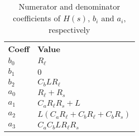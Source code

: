 \begin{table}[H]
\centering
\begin{tabular}[c]{ll}
\textbf{Coeff} & \textbf{Value} \\ 
\rowcolor{myyellow}
$b_{0}$ &$R_{\ell}$ \\ 
$b_{1}$ &$0$ \\ 
\rowcolor{myyellow}
$b_{2}$ &$C_{b} L R_{\ell}$ \\ 
$a_{0}$ &$R_{\ell} + R_{s}$ \\ 
\rowcolor{myyellow}
$a_{1}$ &$C_{a} R_{\ell} R_{s} + L$ \\ 
$a_{2}$ &$L \left(C_{a} R_{\ell} + C_{b} R_{\ell} + C_{b} R_{s}\right)$ \\ 
\rowcolor{myyellow}
$a_{3}$ &$C_{a} C_{b} L R_{\ell} R_{s}$ \\ 
\end{tabular}
\caption{Numerator and denominator coefficients of $H(s)$, $b_i$ and $a_i$, respectively}
\label{tab-coeffs}
\end{table}

